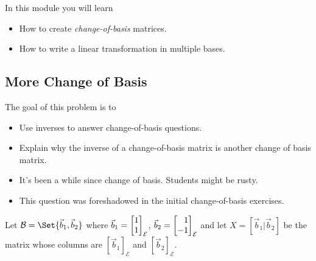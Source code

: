 \begin{module}

	In this module you will learn
	\begin{itemize}
		\item How to create \emph{change-of-basis} matrices.
		\item How to write a linear transformation in multiple bases.
	\end{itemize}

	
	
\end{module}
	\bookonlynewpage
\subsection*{More Change of Basis}
	\question
	\begin{annotation}
		\begin{goals}

			The goal of this problem is to
			\begin{itemize}
				\item Use inverses to answer change-of-basis questions.
				\item Explain why the inverse of a change-of-basis matrix is another
					change of basis matrix.
			\end{itemize}
		\end{goals}

		\begin{notes}
			\begin{itemize}
				\item It's been a while since change of basis. Students might be rusty.
				\item This question was foreshadowed in the initial change-of-basis exercises.
			\end{itemize}
		\end{notes}
	\end{annotation}
	Let $\mathcal B=\Set{\vec b_1,\vec b_2}$ where $\vec b_1=\mat{1\\1}_{\mathcal E}$, $\vec b_2=\mat{1\\-1}_{\mathcal E}$
	and let $X=[\vec b_1|\vec b_2]$ be the matrix whose columns are $[\vec b_1]_{\mathcal E}$ and $[\vec b_2]_{\mathcal E}$.

